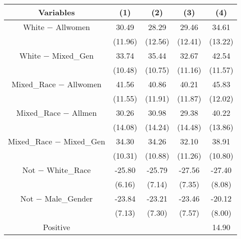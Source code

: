 \begin{table}[htbp]
    \begin{tabular}{c c c c c}
    \toprule
    \textbf{Variables} & \textbf{(1)} & \textbf{(2)} & \textbf{(3)}      & \textbf{(4)}     \\ 
\midrule
White $-$ Allwomen           &     30.49\sym{**}    &     28.29\sym{**}  &  29.46\sym{***}    &  34.61\sym{**} \\
                                 &     (11.96)          &     (12.56)        &  (12.41)           &  (13.22) \\
White $-$ Mixed_{Gen}        &      33.74\sym{***}  &     35.44\sym{***} &   32.67\sym{***}   &  42.54\sym{***}  \\
                                 &      (10.48)         &     (10.75)        &   (11.16)          &  (11.57) \\
Mixed_{Race} $-$ Allwomen        &      41.56\sym{***}  &    40.86\sym{***}  &  40.21\sym{***}    &  45.83\sym{***}  \\
                                 &      (11.55)         &    (11.91)         &  (11.87)           &  (12.02) \\
Mixed_{Race} $-$ Allmen          &      30.26\sym{**}   &    30.98\sym{**}   &  29.38\sym{**}    &  40.22\sym{***}\\
                                 &      (14.08)         &    (14.24)         &  (14.48)           &  (13.86) \\
Mixed_{Race} $-$ Mixed_{Gen}     &      34.30\sym{***} &     34.26\sym{***}  &  32.10\sym{***}    &  38.91\sym{***}  \\
                                 &      (10.31)        &     (10.88)         &  (11.26)           &  (10.80)  \\
Not $-$ White_{Race}         &     -25.80\sym{***} &    -25.79\sym{***}  & -27.56\sym{**}     &  -27.40\sym{*}  \\
                                 &      (6.16)         &     (7.14)          &  (7.35)            &  (8.08)  \\
Not $-$ Male_{Gender}            &     -23.84\sym{***} &    -23.21\sym{***}  & -23.46\sym{***}    &  -20.12\sym{**}  \\
                                 &      (7.13)         &     (7.30)          &  (7.57)            &  (8.00)  \\
Positive                         &                     &                     &                    &  14.90\sym{*}  \\

\end{tabular}
\end{table}

